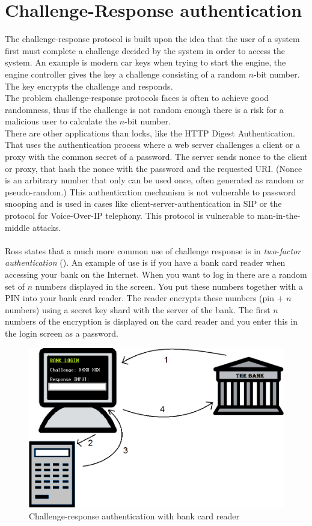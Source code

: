\section{Challenge-Response authentication}\label{sec:challResp} 
The challenge-response protocol is built upon the idea that the user of a system first must complete a challenge decided by the system in order to access the system. An example is modern car keys when trying to start the engine, the engine controller gives the key a challenge consisting of a random $n$-bit number. The key encrypts the challenge and responds. \\
The problem challenge-response protocols faces is often to achieve good randomness, thus if the challenge is not random enough there is a risk for a malicious user to calculate the $n$-bit number. \\
There are other applications than locks, like the HTTP Digest Authentication. That uses the authentication process where a web server challenges a client or a proxy with the common secret of a password. The server sends nonce to the client or proxy, that hash the nonce with the password and the requested URI. (Nonce is an arbitrary number that only can be used once, often generated as random or pseudo-random.) This authentication mechanism is not vulnerable to password snooping and is used in cases like client-server-authentication in SIP or the protocol for Voice-Over-IP telephony. This protocol is vulnerable to man-in-the-middle attacks. \\
\\
Ross states that a much more common use of challenge response is in \textit{two-factor authentication} (). An example of use is if you have a bank card reader when accessing your bank on the Internet. When you want to log in there are a random set of $n$ numbers displayed in the screen. You put these numbers together with a PIN into your bank card reader. The reader encrypts these numbers (pin + $n$ numbers) using a secret key shard with the server of the bank. The first $n$ numbers of the encryption is displayed on the card reader and you enter this in the login screen as a password.
\newpage
\begin{figure}[h]
	\centering
    \includegraphics[scale=0.4]{img/challenge-response-bank}
    \caption{Challenge-response authentication with bank card reader}
  \label{fig:challengeResponse}
\end{figure}
